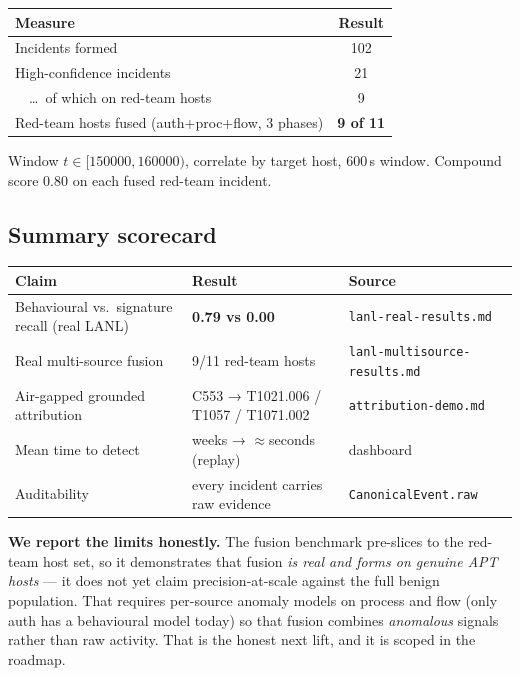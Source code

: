 \documentclass[11pt,a4paper]{article}
\begin{document}
\begin{center}
\begin{tabularx}{\linewidth}{@{}Y c@{}}
\toprule
\textbf{Measure} & \textbf{Result} \\
\midrule
Incidents formed & 102 \\
High-confidence incidents & 21 \\
\ \ …\ of which on red-team hosts & 9 \\
Red-team hosts fused (auth+proc+flow, 3 phases) & \textbf{9 of 11} \\
\bottomrule
\end{tabularx}
\end{center}
{\small Window $t\in[150000,160000)$, correlate by target host, 600\,s window. Compound score
0.80 on each fused red-team incident.\par}

\subsection{Summary scorecard}

\begin{center}
\begin{tabularx}{\linewidth}{@{}Y L{3.4cm} L{4.6cm}@{}}
\toprule
\textbf{Claim} & \textbf{Result} & \textbf{Source} \\
\midrule
Behavioural vs.\ signature recall (real LANL) & \textbf{0.79 vs 0.00} & \texttt{lanl-real-results.md} \\
Real multi-source fusion & 9/11 red-team hosts & \texttt{lanl-multisource-results.md} \\
Air-gapped grounded attribution & C553 → T1021.006 / T1057 / T1071.002 & \texttt{attribution-demo.md} \\
Mean time to detect & weeks → $\approx$seconds (replay) & dashboard \\
Auditability & every incident carries raw evidence & \texttt{CanonicalEvent.raw} \\
\bottomrule
\end{tabularx}
\end{center}

\begin{warnbox}
\textbf{We report the limits honestly.} The fusion benchmark pre-slices to the red-team host
set, so it demonstrates that fusion \emph{is real and forms on genuine APT hosts} — it does not
yet claim precision-at-scale against the full benign population. That requires per-source
anomaly models on process and flow (only auth has a behavioural model today) so that fusion
combines \emph{anomalous} signals rather than raw activity. That is the honest next lift, and it
is scoped in the roadmap.
\end{warnbox}
\end{document}
